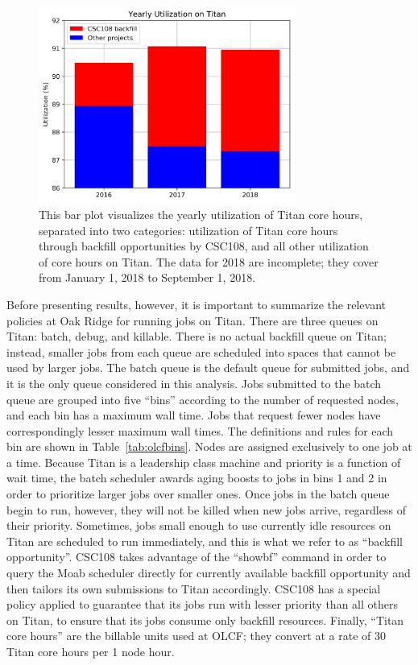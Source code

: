 \begin{figure}
  \includegraphics[width=0.75\textwidth]{images/barplot-jacks-slide.png}
\caption{This bar plot visualizes the yearly utilization of Titan core hours,
separated into two categories: utilization of Titan core hours through backfill
opportunities by CSC108, and all other utilization of core hours on Titan. The
data for 2018 are incomplete; they cover from January 1, 2018 to September 1,
2018.}
\label{fig:jacks-slide}
\end{figure}


Before presenting results, however, it is important to summarize the relevant
policies at Oak Ridge for running jobs on Titan. There are three queues on
Titan: batch, debug, and killable. There is no actual backfill queue on Titan;
instead, smaller jobs from each queue are scheduled into spaces that cannot be
used by larger jobs. The batch queue is the default queue for submitted jobs,
and it is the only queue considered in this analysis. Jobs submitted to the
batch queue are grouped into five ``bins'' according to the number of requested
nodes, and each bin has a maximum wall time. Jobs that request fewer nodes have
correspondingly lesser maximum wall times. The definitions and rules for each
bin are shown in Table~\ref{tab:olcfbins}. Nodes are assigned exclusively to
one job at a time. Because Titan is a leadership class machine and priority is
a function of wait time, the batch scheduler awards aging boosts to jobs in
bins 1 and 2 in order to prioritize larger jobs over smaller ones. Once jobs in
the batch queue begin to run, however, they will not be killed when new jobs
arrive, regardless of their priority. Sometimes, jobs small enough to use
currently idle resources on Titan are scheduled to run immediately, and this is
what we refer to as ``backfill opportunity''. CSC108 takes advantage of the
``showbf'' command in order to query the Moab scheduler directly for currently
available backfill opportunity and then tailors its own submissions to Titan
accordingly. CSC108 has a special policy applied to guarantee that its jobs run
with lesser priority than all others on Titan, to ensure that its jobs consume
only backfill resources. Finally, ``Titan core hours'' are the billable units
used at OLCF; they convert at a rate of 30 Titan core hours per 1 node hour.

